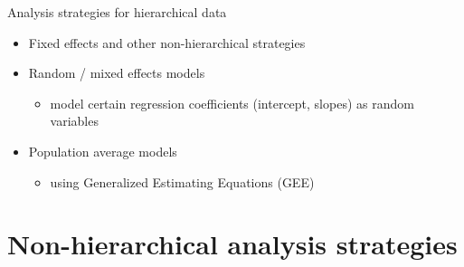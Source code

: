 \documentclass[
  ignorenonframetext,
]{beamer}
\providecommand{\tightlist}{%
  \setlength{\itemsep}{0pt}\setlength{\parskip}{0pt}}
\begin{document}
\begin{frame}{Analysis strategies for hierarchical data}
\protect\hypertarget{analysis-strategies-for-hierarchical-data}{}

\begin{itemize}
\tightlist
\item
  Fixed effects and other non-hierarchical strategies
\item
  Random / mixed effects models

  \begin{itemize}
  \tightlist
  \item
    model certain regression coefficients (intercept, slopes) as random
    variables
  \end{itemize}
\item
  Population average models

  \begin{itemize}
  \tightlist
  \item
    using Generalized Estimating Equations (GEE)
  \end{itemize}
\end{itemize}

\end{frame}

\hypertarget{non-hierarchical-analysis-strategies}{%
\section{Non-hierarchical analysis
strategies}\label{non-hierarchical-analysis-strategies}}
\end{document}
